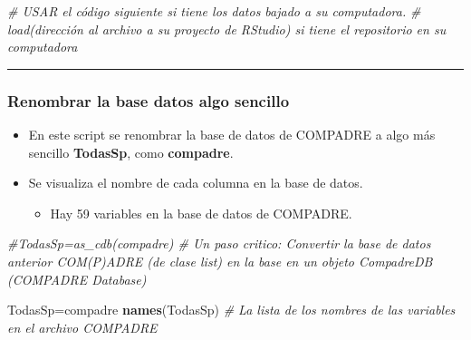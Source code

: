 \documentclass[
]{book}
\newenvironment{Shaded}{\begin{snugshade}}{\end{snugshade}}
\newcommand{\CommentTok}[1]{\textcolor[rgb]{0.56,0.35,0.01}{\textit{#1}}}
\newcommand{\FunctionTok}[1]{\textcolor[rgb]{0.13,0.29,0.53}{\textbf{#1}}}
\newcommand{\NormalTok}[1]{#1}
\newcommand{\OtherTok}[1]{\textcolor[rgb]{0.56,0.35,0.01}{#1}}
\providecommand{\tightlist}{%
  \setlength{\itemsep}{0pt}\setlength{\parskip}{0pt}}
\theoremstyle{definition}
\theoremstyle{definition}
\theoremstyle{definition}
\theoremstyle{definition}
\theoremstyle{remark}
\begin{document}
\begin{Shaded}
\begin{Highlighting}[]
\CommentTok{\# USAR el código siguiente si tiene los datos bajado a su computadora. }
\CommentTok{\# load(dirección al archivo a su proyecto de RStudio) si tiene el repositorio en su computadora}
\end{Highlighting}
\end{Shaded}

\begin{center}\rule{0.5\linewidth}{0.5pt}\end{center}

\subsubsection{Renombrar la base datos algo sencillo}\label{renombrar-la-base-datos-algo-sencillo}

\begin{itemize}
\tightlist
\item
  En este script se renombrar la base de datos de COMPADRE a algo más sencillo \textbf{TodasSp}, como \textbf{compadre}.
\item
  Se visualiza el nombre de cada columna en la base de datos.

  \begin{itemize}
  \tightlist
  \item
    Hay 59 variables en la base de datos de COMPADRE.
  \end{itemize}
\end{itemize}

\begin{Shaded}
\begin{Highlighting}[]
\CommentTok{\#TodasSp=as\_cdb(compadre)  \# Un paso critico: Convertir la base de datos anterior COM(P)ADRE (de clase \textquotesingle{}list\textquotesingle{}) en la base en un objeto CompadreDB (COMPADRE Database)}

\NormalTok{TodasSp}\OtherTok{=}\NormalTok{compadre}
\FunctionTok{names}\NormalTok{(TodasSp) }\CommentTok{\# La lista de los nombres de las variables en el archivo COMPADRE}
\end{Highlighting}
\end{Shaded}
\end{document}
